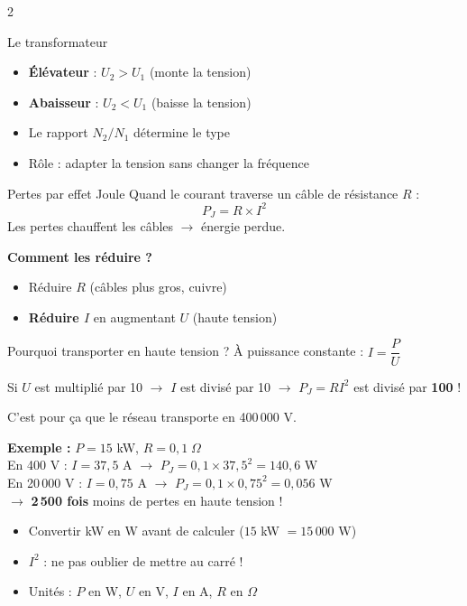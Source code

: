 \documentclass[a4paper,10pt]{article}
\begin{document}
\begin{multicols}{2}
\begin{defbox}{Le transformateur}
\begin{itemize}[nosep,leftmargin=12pt]
  \item \textbf{Élévateur} : $U_2 > U_1$ (monte la tension)
  \item \textbf{Abaisseur} : $U_2 < U_1$ (baisse la tension)
  \item Le rapport $N_2/N_1$ détermine le type
  \item Rôle : adapter la tension sans changer la fréquence
\end{itemize}
\end{defbox}

\begin{defbox}{Pertes par effet Joule}
Quand le courant traverse un câble de résistance $R$ :
$$P_J = R \times I^2$$
Les pertes chauffent les câbles $\to$ énergie perdue.

\textbf{Comment les réduire ?}
\begin{itemize}[nosep,leftmargin=12pt]
  \item Réduire $R$ (câbles plus gros, cuivre)
  \item \textbf{Réduire $I$} en augmentant $U$ (haute tension)
\end{itemize}
\end{defbox}

\begin{methbox}{Pourquoi transporter en haute tension ?}
À puissance constante : $I = \dfrac{P}{U}$

Si $U$ est multiplié par 10 $\to$ $I$ est divisé par 10 $\to$ $P_J = RI^2$ est divisé par \textbf{100} !

C'est pour ça que le réseau transporte en 400\,000 V.
\end{methbox}

\begin{exbox}
\textbf{Exemple :} $P = 15$ kW, $R = 0{,}1\;\Omega$\\[4pt]
En 400 V : $I = 37{,}5$ A $\to$ $P_J = 0{,}1 \times 37{,}5^2 = 140{,}6$ W\\
En 20\,000 V : $I = 0{,}75$ A $\to$ $P_J = 0{,}1 \times 0{,}75^2 = 0{,}056$ W\\[4pt]
$\to$ \textbf{2\,500 fois} moins de pertes en haute tension !
\end{exbox}

\begin{attbox}
\begin{itemize}[nosep,leftmargin=12pt]
  \item Convertir kW en W avant de calculer ($15$ kW $= 15\,000$ W)
  \item $I^2$ : ne pas oublier de mettre au carré !
  \item Unités : $P$ en W, $U$ en V, $I$ en A, $R$ en $\Omega$
\end{itemize}
\end{attbox}


\end{multicols}
\end{document}
